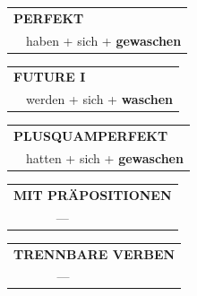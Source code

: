 \documentclass[10pt,a4paper]{revtex4-2}
\begin{document}
\begin{verbbox-acc}
    \vspace{10pt}

 \begin{tabular}{rl}
     \multicolumn{2}{l}{\textbf{PERFEKT}}\\
    &haben + sich + \textbf{gewaschen}\\
  \end{tabular}
\hfill
   \begin{tabular}{rl}
   
    \multicolumn{2}{l}{\textbf{FUTURE I} }\\
    &werden + sich + \textbf{waschen}\\
 
  \end{tabular}
\hfill
   \begin{tabular}{rl}
      \multicolumn{2}{l}{\textbf{PLUSQUAMPERFEKT}}\\
    &hatten + sich + \textbf{gewaschen}\\
  \end{tabular}
  
\vspace{10pt}

\begin{tabular}{lll}
\multicolumn{3}{l}{\textbf{MIT PRÄPOSITIONEN}}\\
& ---\\
\end{tabular}
\hfill
\begin{tabular}{lll}
\multicolumn{3}{l}{\textbf{TRENNBARE VERBEN}}\\
& ---\\
\end{tabular}

\vspace{-5pt}

\end{verbbox-acc}
\end{document}

